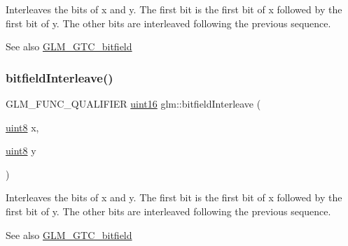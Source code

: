 Interleaves the bits of x and y. The first bit is the first bit of x followed by the first bit of y. The other bits are interleaved following the previous sequence.

\begin{DoxySeeAlso}{See also}
\hyperlink{group__gtc__bitfield}{G\+L\+M\+\_\+\+G\+T\+C\+\_\+bitfield} 
\end{DoxySeeAlso}
\mbox{\label{group__gtc__bitfield_ga0700a3ceb088a0ecc23d76c154096061}} 
\subsubsection{\texorpdfstring{bitfield\+Interleave()}{bitfieldInterleave()}\hspace{0.1cm}{\footnotesize\ttfamily [2/16]}}
{\footnotesize\ttfamily G\+L\+M\+\_\+\+F\+U\+N\+C\+\_\+\+Q\+U\+A\+L\+I\+F\+I\+ER \hyperlink{group__gtc__type__precision_gad8c2939e1fdd8e5828b31d95c52255d5}{uint16} glm\+::bitfield\+Interleave (\begin{DoxyParamCaption}\item[{\hyperlink{group__gtc__type__precision_ga1a7dcd8aac97cc8020817c94049deff2}{uint8}}]{x,  }\item[{\hyperlink{group__gtc__type__precision_ga1a7dcd8aac97cc8020817c94049deff2}{uint8}}]{y }\end{DoxyParamCaption})}

Interleaves the bits of x and y. The first bit is the first bit of x followed by the first bit of y. The other bits are interleaved following the previous sequence.

\begin{DoxySeeAlso}{See also}
\hyperlink{group__gtc__bitfield}{G\+L\+M\+\_\+\+G\+T\+C\+\_\+bitfield} 
\end{DoxySeeAlso}
\mbox{\label{group__gtc__bitfield_ga1a0264598647ae00a596865af4e1e878}} 
